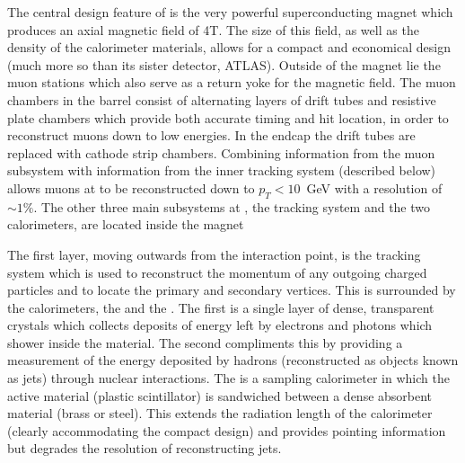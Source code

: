 The central design feature of \CMS is the very powerful superconducting magnet which produces an axial magnetic field of 4T. The size of this field, as well as the density of the calorimeter materials, allows for a compact and economical design (much more so than its sister detector, ATLAS). Outside of the magnet lie the muon stations which also serve as a return yoke for the magnetic field. The muon chambers in the barrel consist of alternating layers of drift tubes and resistive plate chambers which provide both accurate timing and hit location, in order to reconstruct muons down to low energies. In the endcap the drift tubes are replaced with cathode strip chambers. Combining information from the muon subsystem with information from the inner tracking system (described below) allows muons at \CMS to be reconstructed down to $p_{T}<10$~GeV with a resolution of $\sim1\%$. The other three main subsystems at \CMS, the tracking system and the two calorimeters, are located inside the magnet

The first layer, moving outwards from the interaction point, is the tracking system which is used to reconstruct the momentum of any outgoing charged particles and to locate the primary and secondary vertices. This is surrounded by the calorimeters, the \ECAL and the \HCAL. The first is a single layer of dense, transparent crystals which collects deposits of energy left by electrons and photons which shower inside the material. The second compliments this by providing a measurement of the energy deposited by hadrons (reconstructed as objects known as jets) through nuclear interactions. The \HCAL is a sampling calorimeter in which the active material (plastic scintillator) is sandwiched between a dense absorbent material (brass or steel). This extends the radiation length of the calorimeter (clearly accommodating the compact design) and provides pointing information but degrades the resolution of reconstructing jets. 


